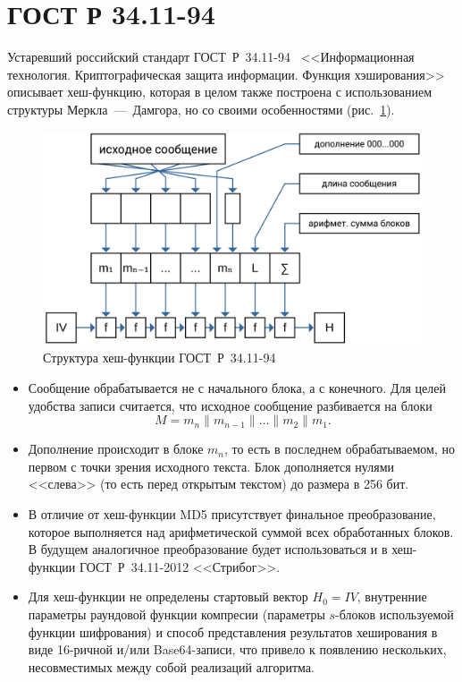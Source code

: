 \section{ГОСТ Р 34.11-94}

Устаревший российский стандарт ГОСТ~Р~34.11-94~\cite{GOST-94} <<Информационная технология. Криптографическая защита информации. Функция хэширования>> описывает хеш-функцию, которая в целом также построена с использованием структуры Меркла~---~Дамгора, но со своими особенностями (рис.~\ref{fig:gost-94}).

\begin{figure}[htb]
    \centering
    \includegraphics[width=\textwidth]{pic/gost-94}
    \caption{Структура хеш-функции ГОСТ~Р~34.11-94}
    \label{fig:gost-94}
\end{figure}

\begin{itemize}
  \item Сообщение обрабатывается не с начального блока, а с конечного. Для целей удобства записи считается, что исходное сообщение разбивается на блоки\[
  M = m_n \| m_{n-1} \| \dots \| m_2 \| m_1.
\]
  \item Дополнение происходит в блоке $m_n$, то есть в последнем обрабатываемом, но первом с точки зрения исходного текста. Блок дополняется нулями <<слева>> (то есть перед открытым текстом) до размера в 256 бит.
  \item В отличие от хеш-функции MD5 присутствует финальное преобразование, которое выполняется над арифметической суммой всех обработанных блоков. В будущем аналогичное преобразование будет использоваться и в хеш-функции ГОСТ~Р~34.11-2012 <<Стрибог>>.
  \item Для хеш-функции не определены стартовый вектор $H_0 = IV$, внутренние параметры раундовой функции компресии (параметры $s$-блоков используемой функции шифрования) и способ представления результатов хеширования в виде 16-ричной и/или Base64-записи, что привело к появлению нескольких, несовместимых между собой реализаций алгоритма.
\end{itemize}

